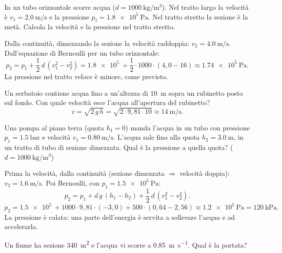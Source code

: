 \begin{testexample}
In un tubo orizzontale scorre acqua ($d = \SI{1000}{\kilogram\per\metre\cubed}$). Nel tratto largo la velocità è $v_1 = \SI{2,0}{\metre\per\second}$ e la pressione $p_1 = \SI{1,8e5}{\pascal}$. Nel tratto stretto la sezione è la metà. Calcola la velocità e la pressione nel tratto stretto.

Dalla continuità, dimezzando la sezione la velocità raddoppia: $v_2 = \SI{4,0}{\metre\per\second}$. Dall'equazione di Bernoulli per un tubo orizzontale:
\[ p_2 = p_1 + \frac{1}{2}\,d\,(v_1^2 - v_2^2) = \SI{1,8e5}{} + \frac{1}{2} \cdot 1000 \cdot (4{,}0 - 16) \approx \SI{1,74e5}{\pascal}. \]
La pressione nel tratto veloce è minore, come previsto.
\end{testexample}

\begin{testexample}
Un serbatoio contiene acqua fino a un'altezza di \SI{10}{\metre} sopra un rubinetto posto sul fondo. Con quale velocità esce l'acqua all'apertura del rubinetto?
\[ v = \sqrt{2\,g\,h} = \sqrt{2 \cdot 9{,}81 \cdot 10} \approx \SI{14}{\metre\per\second}. \]
\end{testexample}

\begin{testexample}
Una pompa al piano terra (quota $h_1 = 0$) manda l'acqua in un tubo con pressione $p_1 = \SI{1,5}{\bar}$ e velocità $v_1 = \SI{0,80}{\metre\per\second}$. L'acqua sale fino alla quota $h_2 = \SI{3,0}{\metre}$, in un tratto di tubo di sezione dimezzata. Qual è la pressione a quella quota? ($d = \SI{1000}{\kilogram\per\metre\cubed}$)

Prima la velocità, dalla continuità (sezione dimezzata $\Rightarrow$ velocità doppia): $v_2 = \SI{1,6}{\metre\per\second}$. Poi Bernoulli, con $p_1 = \SI{1,5e5}{\pascal}$:
\[ p_2 = p_1 + d\,g\,(h_1 - h_2) + \frac{1}{2}\,d\,(v_1^2 - v_2^2). \]
\[ p_2 = \SI{1,5e5}{} + 1000 \cdot 9{,}81 \cdot (-3{,}0) + 500 \cdot (0{,}64 - 2{,}56) \approx \SI{1,2e5}{\pascal} = \SI{120}{\kilo\pascal}. \]
La pressione è calata: una parte dell'energia è servita a sollevare l'acqua e ad accelerarla.
\end{testexample}

\begin{esercizio}
Un fiume ha sezione \SI{340}{\metre\squared} e l'acqua vi scorre a \SI{0,85}{\metre\per\second}. Qual è la portata?\\
\end{esercizio}


